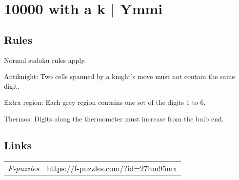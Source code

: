 \section{10000 with a k | {\normalfont Ymmi}}
\label{sec:05-10000-with-a-k-ymmi}

\subsection*{Rules}
\begin{markdown}
Normal sudoku rules apply.

Antiknight: Two cells spanned by a knight's move must not contain the same digit.

Extra region: Each grey region contains one set of the digits 1 to 6.

Thermos: Digits along the thermometer must increase from the bulb end.
\end{markdown}
\subsection*{Links}
\begin{tabularx}{\textwidth}{l X}
\emph{F-puzzles} & \url{https://f-puzzles.com/?id=27hm95mx} \\
\end{tabularx}
\pagebreak
